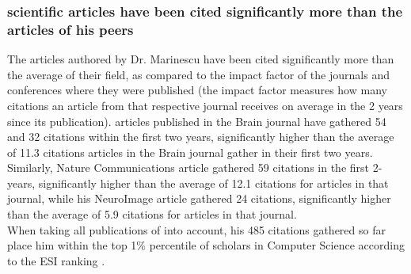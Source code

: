 \documentclass[11pt]{article}
\begin{document}
 \se

\subsubsection{\drs scientific articles have been cited significantly more than the articles of his peers}
\label{articlespeers}

The articles authored by Dr. Marinescu have been cited significantly more than the average of their field, as compared to the impact factor of the journals and conferences where they were published (the impact factor measures how many citations an article from that respective journal receives on average in the 2 years since its publication). \drs articles published in the Brain journal have gathered 54 and 32 citations within the first two years, significantly higher than the average of 11.3 citations articles in the Brain journal gather in their first two years. Similarly, \drs Nature Communications article gathered 59 citations in the first 2-years, significantly higher than the average of 12.1 citations for articles in that journal, while his NeuroImage article gathered 24 citations, significantly higher than the average of 5.9 citations for articles in that journal.\\

When taking all publications of \dr into account, his 485 citations gathered so far place him within the top 1\% percentile of scholars in Computer Science according to the ESI ranking \cite{esi}.
\end{document}
